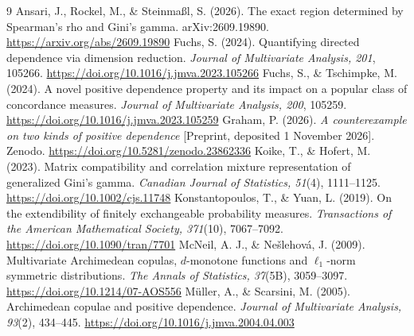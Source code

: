\documentclass[11pt,a4paper]{article}
\theoremstyle{remark}
\begin{document}
\begin{thebibliography}{9}
 Ansari, J., Rockel, M., \& Steinma{\ss}l, S. (2026). The exact region determined by Spearman's rho and Gini's gamma. arXiv:2609.19890. \url{https://arxiv.org/abs/2609.19890}
 Fuchs, S. (2024). Quantifying directed dependence via dimension reduction. \emph{Journal of Multivariate Analysis, 201}, 105266. \url{https://doi.org/10.1016/j.jmva.2023.105266}
 Fuchs, S., \& Tschimpke, M. (2024). A novel positive dependence property and its impact on a popular class of concordance measures. \emph{Journal of Multivariate Analysis, 200}, 105259. \url{https://doi.org/10.1016/j.jmva.2023.105259}
 Graham, P. (2026). \emph{A counterexample on two kinds of positive dependence} [Preprint, deposited 1 November 2026]. Zenodo. \url{https://doi.org/10.5281/zenodo.23862336}
 Koike, T., \& Hofert, M. (2023). Matrix compatibility and correlation mixture representation of generalized Gini's gamma. \emph{Canadian Journal of Statistics, 51}(4), 1111--1125. \url{https://doi.org/10.1002/cjs.11748}
 Konstantopoulos, T., \& Yuan, L. (2019). On the extendibility of finitely exchangeable probability measures. \emph{Transactions of the American Mathematical Society, 371}(10), 7067--7092. \url{https://doi.org/10.1090/tran/7701}
 McNeil, A. J., \& Ne\v{s}lehov\'a, J. (2009). Multivariate Archimedean copulas, $d$-monotone functions and $\ell_1$-norm symmetric distributions. \emph{The Annals of Statistics, 37}(5B), 3059--3097. \url{https://doi.org/10.1214/07-AOS556}
 M\"uller, A., \& Scarsini, M. (2005). Archimedean copulae and positive dependence. \emph{Journal of Multivariate Analysis, 93}(2), 434--445. \url{https://doi.org/10.1016/j.jmva.2004.04.003}
\end{thebibliography}
\end{document}
